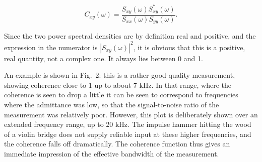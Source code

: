   $$C_{xy}(\omega)=\dfrac{S_{xy}(\omega)S^*_{xy}(\omega)}{S_{xx}(\omega) 
  S_{yy}(\omega)} .\tag{4}$$ 

  Since the two power spectral densities are by definition real and positive, 
  and the expression in the numerator is $|S_{xy}(\omega)|^2$, it is obvious 
  that this is a positive, real quantity, not a complex one. It always lies 
  between 0 and 1. 

  An example is shown in Fig.\ 2: this is a rather good-quality measurement, 
  showing coherence close to 1 up to about 7 kHz. In that range, where the 
  coherence is seen to drop a little it can be seen to correspond to 
  frequencies where the admittance was low, so that the signal-to-noise ratio 
  of the measurement was relatively poor. However, this plot is deliberately 
  shown over an extended frequency range, up to 20 kHz. The impulse hammer 
  hitting the wood of a violin bridge does not supply reliable input at these 
  higher frequencies, and the coherence falls off dramatically. The coherence 
  function thus gives an immediate impression of the effective bandwidth of the 
  measurement. 